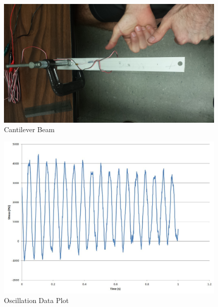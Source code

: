 \documentclass[12pt]{article}
\begin{document}
\begin{figure}[h!] %
   \centering
   \includegraphics[width=5in]{cantilever_beam.jpg} 
   \caption{Cantilever Beam}
   \label{fig:example}
\end{figure}

\newpage

\begin{figure}[h!] %
   \centering
   \includegraphics[width=5.5in]{nat_freq_plot.jpg} 
   \caption{Oscillation Data Plot}
   \label{fig:example}
\end{figure}

\bigskip
\end{document}
